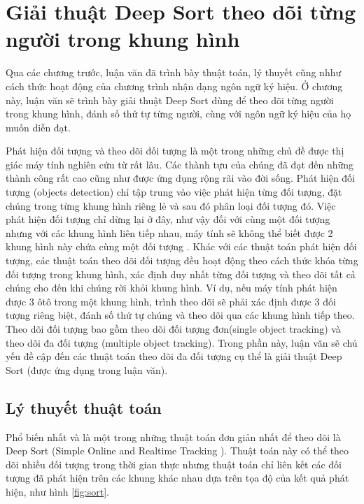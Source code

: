 \chapter{Giải thuật Deep Sort theo dõi từng người trong khung hình}
Qua các chương trước, luận văn đã trình bày thuật toán, lý thuyết cũng nhhư cách thức hoạt động của chương trình nhận dạng ngôn ngữ ký hiệu. Ở chương này, luận văn sẽ trình bày giải thuật Deep Sort dùng để theo dõi từng người trong khung hình, đánh số thứ tự từng người, cùng với ngôn ngữ ký hiệu của họ muốn diễn đạt.

Phát hiện đối tượng và theo dõi đối tượng là một trong những chủ đề được thị giác máy tính nghiên cứu từ rất lâu. Các thành tựu của chúng đã đạt đến những thành công rất cao cũng như được ứng dụng rộng rãi vào đời sống. Phát hiện đối tượng (objects detection) chỉ tập trung vào việc phát hiện từng đối tượng, đặt chúng trong từng khung hình riêng lẻ và sau đó phân loại đối tượng đó. Việc phát hiện đối tượng chỉ dừng lại ở đây, như vậy đối với cùng một đối tượng nhưng với các khung hình liên tiếp nhau, máy tính sẽ không thể biết được 2 khung hình này chứa cùng một đối tượng . Khác với các thuật toán phát hiện đối tượng, các thuật toán theo dõi đối tượng đều hoạt động theo cách thức khóa từng đối tượng trong khung hình, xác định duy nhất từng đối tượng và theo dõi tất cả chúng cho đến khi chúng rời khỏi khung hình. Ví dụ, nếu máy tính phát hiện được 3 ôtô trong một khung hình, trình theo dõi sẽ phải xác định được 3 đối tượng riêng biệt, đánh số thứ tự chúng và theo dõi qua các khung hình tiếp theo. Theo dõi đối tượng bao gồm theo dõi đối tượng đơn(single object tracking) và theo dõi đa đối tượng (multiple object tracking). Trong phần này, luận văn sẽ chủ yếu đề cập đến các thuật toán theo dõi đa đối tượng cụ thể là giải thuật Deep Sort (được ứng dụng trong luận văn).  

\section{Lý thuyết thuật toán}
Phổ biến nhất và là một trong những thuật toán đơn giản nhất để theo dõi là Deep Sort (Simple Online and Realtime Tracking \cite{wojke2017simple}). Thuật toán này có thể theo dõi nhiều đối tượng trong thời gian thực nhưng thuật toán chỉ liên kết các đối tượng đã phát hiện trên các khung khác nhau dựa trên tọa độ của kết quả phát hiện, như hình \ref{fig:sort}.

